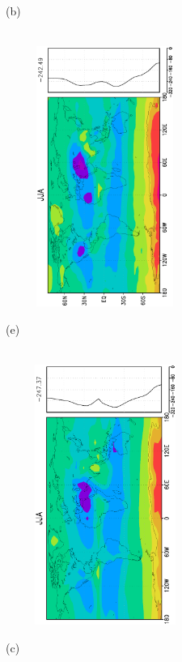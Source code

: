 \documentclass[12pt,a4paper,twoside,openright,headinclude,liststotoc,bibtotoc]{scrreprt}
\begin{document}
\begin{figure}[H]
{}
\parbox{8.5cm}{\hspace{0.50cm}\begin{scriptsize}(b)\end{scriptsize} \vspace{-0.7cm} \\
\includegraphics[height=8.5cm,width=6.5cm,angle=-90]
{eps/zonalysmthermrad179JJA.eps}
}
\parbox{8.5cm}{\hspace{0.26cm}\begin{scriptsize}(e)\end{scriptsize} \vspace{-0.7cm} \\
\includegraphics[height=8.5cm,width=6.5cm,angle=-90]
{eps/zonalt21ysmthermradJJA.eps}
}
\parbox{8.5cm}{\hspace{0.50cm}\begin{scriptsize}(c)\end{scriptsize} \vspace{-0.7cm} \\
}
\end{figure}
\end{document}
